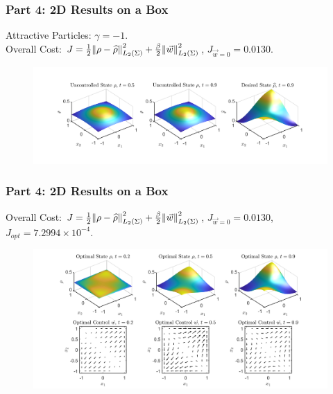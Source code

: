 \documentclass[aspectratio=169,xcolor=dvipsnames]{beamer}
\begin{document}
\begin{frame}
	\frametitle{Part 4: 2D Results on a Box}
    Attractive Particles: $\gamma = -1$.\\
	Overall Cost: $J = \frac{1}{2}\norm{\rho- \widehat{\rho}}_{L_2(\Sigma)}^2 + \frac{\beta}{2} \norm{\vec{w}}_{L_2(\Sigma)}^2$, $J_{\vec{w}=0} = 0.0130$.

	\begin{figure}
		\includegraphics[width=15cm]{Res1Ex2.png}
	\end{figure}
	
\end{frame}

\begin{frame}
	\frametitle{Part 4: 2D Results on a Box}
	\vspace{0.3cm}
	Overall Cost: $J = \frac{1}{2}\norm{\rho- \widehat{\rho}}_{L_2(\Sigma)}^2 + \frac{\beta}{2} \norm{\vec{w}}_{L_2(\Sigma)}^2$, $J_{\vec{w}=0} = 0.0130$, $J_{opt} = 7.2994 \times 10^{-4}$.
	\begin{figure}
		\includegraphics[width=14cm]{Res2Ex2.png}
	\end{figure}
\end{frame}
\end{document}
